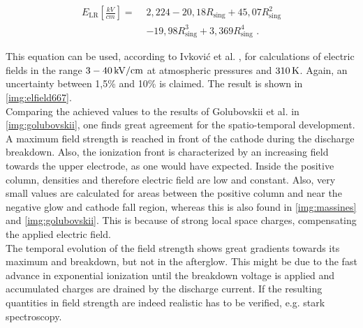 \documentclass[a4paper,10pt,twoside]{article}
\newcommand{\ix}[1]{_\text{#1}}
\begin{document}
			\begin{align}
				E\ix{LR}\left[\frac{kV}{cm}\right] =\,\, &2,224-20,18R\ix{sing}+45,07R\ix{sing}^2 \nonumber \\ 
				&-19,98R\ix{sing}^3+3,369R\ix{sing}^4\,\,. \label{eq:elfield}
			\end{align}
				
		This equation can be used, according to Ivkovi{\'c} et al. \cite{linratio1_14}, for calculations of electric fields in the range $\unit[3-40]{kV/cm}$ at atmospheric pressures and $\unit[310]{K}$. Again, an uncertainty between 1,5\% and 10\% is claimed. The result is shown in \autoref{img:elfield667}.\\
		Comparing the achieved values to the results of Golubovskii et al. \cite{0022-3727-36-1-306} in \autoref{img:golubovskii}, one finds great agreement for the spatio-temporal development. A maximum field strength is reached in front of the cathode during the discharge breakdown. Also, the ionization front is characterized by an increasing field towards the upper electrode, as one would have expected. Inside the positive column, densities and therefore electric field are low and constant. Also, very small values are calculated for areas between the positive column and near the negative glow and cathode fall region, whereas this is also found in \autoref{img:massines} and \autoref{img:golubovskii}. This is because of strong local space charges, compensating the applied electric field.\\
		The temporal evolution of the field strength shows great gradients towards its maximum and breakdown, but not in the afterglow. This might be due to the fast advance in exponential ionization until the breakdown voltage is applied and accumulated charges are drained by the discharge current. If the resulting quantities in field strength are indeed realistic has to be verified, e.g. stark spectroscopy.
		
	\onecolumn
			
\end{document}
